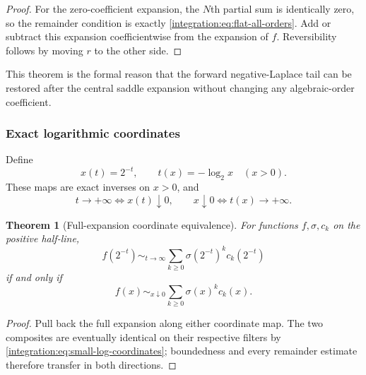 \documentclass[11pt,oneside]{article}
\newtheorem{theorem}{Theorem}[section]
\theoremstyle{definition}
\theoremstyle{remark}
\begin{document}
\begin{proof}
For the zero-coefficient expansion, the $N$th partial sum is identically zero, so the
remainder condition is exactly \eqref{integration:eq:flat-all-orders}.  Add or subtract this expansion
coefficientwise from the expansion of $f$.  Reversibility follows by moving $r$ to the other
side.
\end{proof}

This theorem is the formal reason that the forward negative-Laplace tail can be restored
after the central saddle expansion without changing any algebraic-order coefficient.

\subsubsection{Exact logarithmic coordinates}

Define
\begin{equation}
 x(t)=2^{-t},
 \qquad
 t(x)=-\log_2x
 \quad(x>0).
 \label{integration:eq:small-log-coordinates}
\end{equation}
These maps are exact inverses on $x>0$, and
\begin{equation}
 t\to+\infty\iff x(t)\downarrow0,
 \qquad
 x\downarrow0\iff t(x)\to+\infty.
 \label{integration:eq:coordinate-filter-equivalence}
\end{equation}

\begin{theorem}[Full-expansion coordinate equivalence]
\label{integration:thm:small-log-expansion-equivalence}
For functions $f,\sigma,c_k$ on the positive half-line,
\begin{equation}
 f(2^{-t})\sim_{t\to\infty}
 \sum_{k\ge0}\sigma(2^{-t})^kc_k(2^{-t})
 \label{integration:eq:log-coordinate-expansion}
\end{equation}
if and only if
\begin{equation}
 f(x)\sim_{x\downarrow0}
 \sum_{k\ge0}\sigma(x)^kc_k(x).
 \label{integration:eq:small-coordinate-expansion}
\end{equation}
\end{theorem}

\begin{proof}
Pull back the full expansion along either coordinate map.  The two composites are eventually
identical on their respective filters by \eqref{integration:eq:small-log-coordinates}; boundedness and
every remainder estimate therefore transfer in both directions.
\end{proof}
\end{document}
